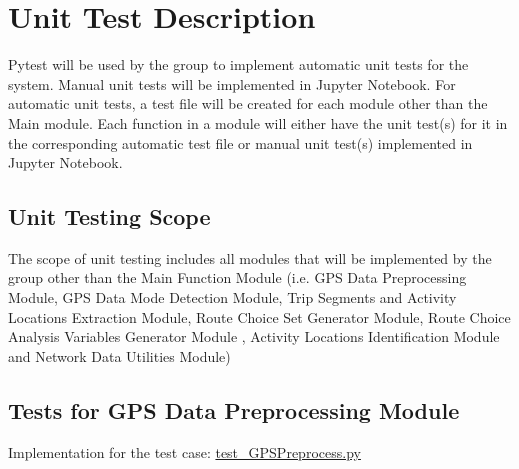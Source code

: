 \documentclass[12pt, titlepage]{article}
\begin{document}
\section{Unit Test Description}
\label{section:6}
Pytest will be used by the group to implement automatic unit tests for the system. Manual unit tests will be implemented in Jupyter Notebook. For automatic unit tests, a test file will be created for each module other than the Main module. Each function in a module will either have the unit test(s) for it in the corresponding automatic test file or manual unit test(s) implemented in Jupyter Notebook. 

\subsection{Unit Testing Scope}
The scope of unit testing includes all modules that will be implemented by the group other than the Main Function Module (i.e. GPS Data Preprocessing Module, GPS Data Mode Detection Module, Trip Segments and Activity Locations Extraction Module, Route Choice Set Generator Module, Route Choice Analysis Variables Generator Module , Activity Locations Identification Module and Network Data Utilities Module)

\subsection{Tests for GPS Data Preprocessing Module}

Implementation for the test case: \href{https://github.com/paezha/PyERT-BLACK/blob/rev1-implementation/test/test_GPSPreprocess.py}{test\_GPSPreprocess.py}
\end{document}

